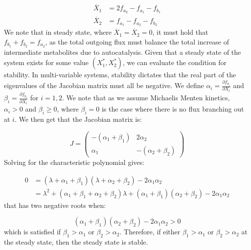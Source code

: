     \begin{align*}
        \dot{X_1} & =2f_{a_2}-f_{a_1}-f_{b_1} \\
        \dot{X_2} & =f_{a_1}-f_{a_2}-f_{b_2}
    \end{align*}
    We note that in steady state, where $\dot{X_1}=\dot{X_2}=0$, it must hold that $f_{b_1}+f_{b_2}=f_{a_2}$, as the total outgoing flux must balance the total increase of intermediate metabolites due to autocatalysis.
    Given that a steady state of the system exists for some value $(X_1^*,X_2^*)$, we can evaluate the condition for stability.
    In multi-variable systems, stability dictates that the real part of the eigenvalues of the Jacobian matrix must all be negative.
    We define $\alpha_i=\frac{\partial f_{a_i}}{\partial X_i}$ and $\beta_i=\frac{\partial f_{b_i}}{\partial X_i}$ for $i=1,2$.
    We note that as we assume Michaelis Menten kinetics, $\alpha_i>0$ and $\beta_i \geq 0$, where $\beta_i=0$ is the case where there is no flux branching out at $i$.
    We then get that the Jacobian matrix is:

    \begin{equation*}
        J=
        \begin{pmatrix}
            -(\alpha_1+\beta_1) & 2\alpha_2 \\
            \alpha_1 & -(\alpha_2+\beta_2)
        \end{pmatrix}
    \end{equation*}
    Solving for the characteristic polynomial gives:

    \begin{align*}
        0 & =(\lambda+\alpha_1+\beta_1)(\lambda+\alpha_2+\beta_2)-2\alpha_1\alpha_2 \\
        & = \lambda^2+(\alpha_1+\beta_1+\alpha_2+\beta_2)\lambda+(\alpha_1+\beta_1)(\alpha_2+\beta_2)-2\alpha_1\alpha_2
    \end{align*}
    that has two negative roots when:

    \begin{equation*}
        (\alpha_1+\beta_1)(\alpha_2+\beta_2)-2\alpha_1\alpha_2>0
    \end{equation*}
    which is satisfied if $\beta_1 > \alpha_1$ or $\beta_2 > \alpha_2$.
    Therefore, if either $\beta_1 > \alpha_1$ or $\beta_2 > \alpha_2$ at the steady state, then the steady state is stable.


